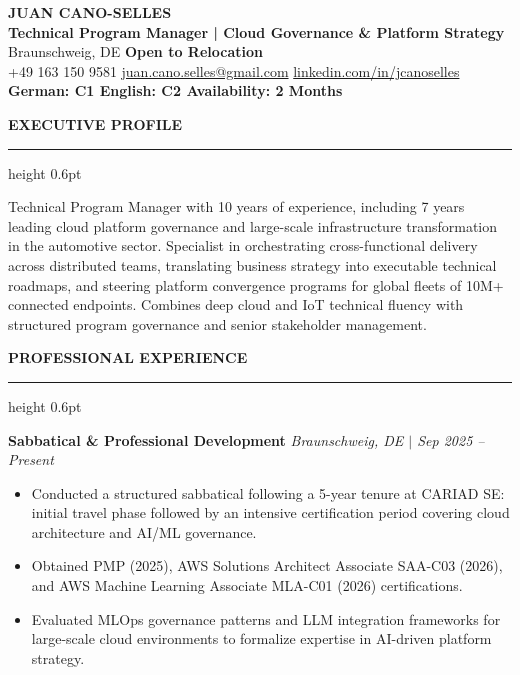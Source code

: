 \documentclass[a4paper,10pt]{article}
\newcommand{\Section}[1]{%
  \vspace{11pt}%
  {\large\bfseries\uppercase{#1}}%
  \vspace{2pt}\par\noindent\hrule height 0.6pt%
  \vspace{5pt}%
}
\begin{document}
{\Huge\bfseries JUAN CANO-SELLES} \\[0.5em]
{\large\textbf{Technical Program Manager | Cloud Governance \& Platform Strategy}} \\[0.7em]
Braunschweig, DE \textbar{} \textbf{Open to Relocation} \\[0.3em]
+49 163 150 9581 \textbar{} \href{mailto:juan.cano.selles@gmail.com}{juan.cano.selles@gmail.com} \textbar{} \href{https://www.linkedin.com/in/jcanoselles}{linkedin.com/in/jcanoselles} \\[0.3em]
\textbf{German: C1 \textbar{} English: C2 \textbar{} Availability: 2 Months}

\Section{Executive Profile}
Technical Program Manager with 10 years of experience, including 7 years leading cloud platform governance and large-scale infrastructure transformation in the automotive sector. Specialist in orchestrating cross-functional delivery across distributed teams, translating business strategy into executable technical roadmaps, and steering platform convergence programs for global fleets of 10M+ connected endpoints. Combines deep cloud and IoT technical fluency with structured program governance and senior stakeholder management.

\Section{Professional Experience}

\textbf{Sabbatical \& Professional Development} \hfill \textit{Braunschweig, DE $|$ Sep 2025 -- Present}
\begin{itemize}
\item Conducted a structured sabbatical following a 5-year tenure at CARIAD SE: initial travel phase followed by an intensive certification period covering cloud architecture and AI/ML governance.
\item Obtained PMP (2025), AWS Solutions Architect Associate SAA-C03 (2026), and AWS Machine Learning Associate MLA-C01 (2026) certifications.
\item Evaluated MLOps governance patterns and LLM integration frameworks for large-scale cloud environments to formalize expertise in AI-driven platform strategy.
\end{itemize}
\end{document}

